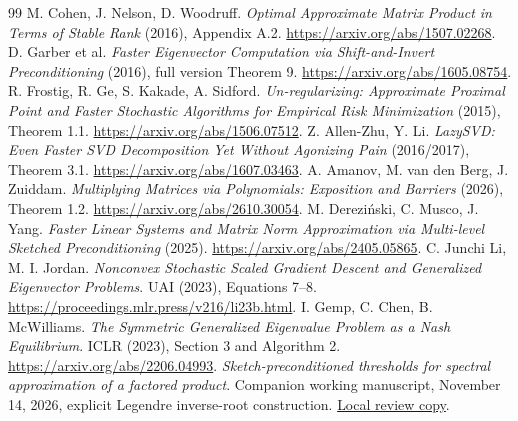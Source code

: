 \documentclass[11pt]{article}
\begin{document}
\begin{thebibliography}{99}
 M. Cohen, J. Nelson, D. Woodruff.
\emph{Optimal Approximate Matrix Product in Terms of Stable Rank}
(2016), Appendix A.2.
\url{https://arxiv.org/abs/1507.02268}.
 D. Garber et al.
\emph{Faster Eigenvector Computation via Shift-and-Invert Preconditioning}
(2016), full version Theorem 9.
\url{https://arxiv.org/abs/1605.08754}.
 R. Frostig, R. Ge, S. Kakade, A. Sidford.
\emph{Un-regularizing: Approximate Proximal Point and Faster Stochastic
Algorithms for Empirical Risk Minimization} (2015), Theorem 1.1.
\url{https://arxiv.org/abs/1506.07512}.
 Z. Allen-Zhu, Y. Li.
\emph{LazySVD: Even Faster SVD Decomposition Yet Without Agonizing Pain}
(2016/2017), Theorem 3.1.
\url{https://arxiv.org/abs/1607.03463}.
 A. Amanov, M. van den Berg, J. Zuiddam.
\emph{Multiplying Matrices via Polynomials: Exposition and Barriers}
(2026), Theorem 1.2.
\url{https://arxiv.org/abs/2610.30054}.
 M. Derezi\'nski, C. Musco, J. Yang.
\emph{Faster Linear Systems and Matrix Norm Approximation via
Multi-level Sketched Preconditioning} (2025).
\url{https://arxiv.org/abs/2405.05865}.
 C. Junchi Li, M. I. Jordan.
\emph{Nonconvex Stochastic Scaled Gradient Descent and Generalized
Eigenvector Problems}. UAI (2023), Equations 7--8.
\url{https://proceedings.mlr.press/v216/li23b.html}.
 I. Gemp, C. Chen, B. McWilliams.
\emph{The Symmetric Generalized Eigenvalue Problem as a Nash Equilibrium}.
ICLR (2023), Section 3 and Algorithm 2.
\url{https://arxiv.org/abs/2206.04993}.
 \emph{Sketch-preconditioned thresholds for spectral
approximation of a factored product}. Companion working manuscript,
November 14, 2026, explicit Legendre inverse-root construction.
\href{sketch-preconditioned-spectral.pdf}{Local review copy}.
\end{thebibliography}
\end{document}
